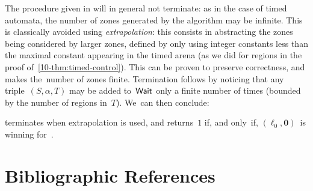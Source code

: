 
The procedure given in  will in general not
terminate: as in the case of timed automata, the number of zones
generated by the algorithm may be infinite. This is classically
avoided using \emph{extrapolation}: this consists in abstracting the
zones being considered by larger zones, defined by only using integer
constants less than the maximal constant appearing in the timed arena
(as we did for regions in the proof
of~\cref{10-thm:timed-control}). This can be proven to preserve
correctness, and makes the~number of zones finite. Termination follows
by noticing that any triple~$(S,\alpha,T)$ may be added to~$\textsf{Wait}$ only
a finite number of times (bounded by the number of regions
in~$T$). 
%
We~can then conclude:
\begin{theorem}
 terminates when extrapolation is used, and returns~$1$ if, and only~if,
$(\ell_0,\mathbf{0})$~is winning for~\Eve.
\end{theorem}









\section*{Bibliographic References}

